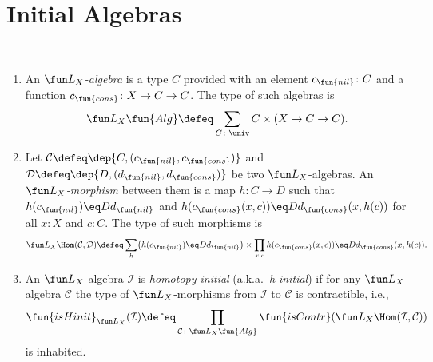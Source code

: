 \section{Initial Algebras}

\begin{defns}\ 
    \begin{enumerate}[-]
            \item An \textsl{$\fun L_X$-algebra} is a type $C$ provided with an element $c_{\fun{nil}}\colon C$ and a function $c_{\fun{cons}}\colon X\to C\to C$. The type of such algebras is
            \[
                \fun L_X\fun{Alg}\defeq\sum_{C\colon\univ}C\times(X\to C\to C).
            \]
            \item Let $\mathcal C\defeq\dep{C,(c_{\fun{nil}},c_{\fun{cons}})}$ and $\mathcal D\defeq\dep{D,(d_{\fun{nil}}, d_{\fun{cons}})}$ be two $\fun L_X$-algebras. An \textsl{$\fun L_X$-morphism} between them is a map $h\colon C\to D$ such that $h(c_{\fun{nil}})\eq Dd_{\fun{nil}}$ and $h(c_{\fun{cons}}(x,c))\eq Dd_{\fun{cons}}(x,h(c))$ for all $x\colon X$ and $c\colon C$. The type of such morphisms is
        \[
            \fun L_X\Hom(\mathcal C,\mathcal D)\defeq
            \sum_{h}
                \bigl(
                    h(c_{\fun{nil}})
                    \eq D
                    d_{\fun{nil}}
                \bigr)
                \times
                \prod_{x,c}
                    h(c_{\fun{cons}}(x,c))
                    \eq D
                    d_{\fun{cons}}(x, h(c)).
        \]
    
        \item An $\fun L_X$-algebra $\mathcal I$ is \textsl{homotopy-initial} (a.k.a.~\textsl{h-initial}) if for any $\fun L_X$-algebra $\mathcal C$ the type of $\fun L_X$-morphisms from $\mathcal I$ to $\mathcal C$ is contractible, i.e.,
        \[
            \fun{isHinit}_{\fun L_X}(\mathcal I)
                \defeq
                \prod_{\mathcal C\colon\fun L_X\fun{Alg}}
                    \fun{isContr}(
                        \fun L_X\Hom(\mathcal I,\mathcal C)
                    )
        \]
        is inhabited.
    \end{enumerate}
\end{defns}

